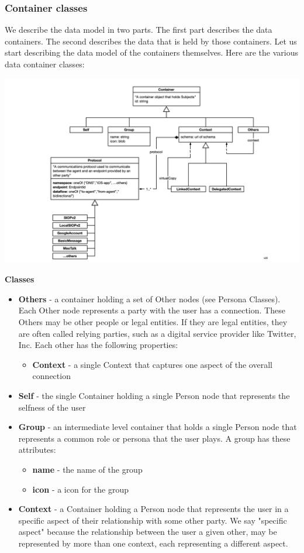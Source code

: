 \documentclass[11pt, oneside]{article}   	%
\begin{document}
\subsubsection{Container classes}

We describe the data model in two parts. The first part describes the data containers. The second describes the data that is held by those containers. Let us start describing the data model of the containers themselves. Here are the various data container classes: 

\includegraphics[width=\textwidth]{./images/container-classes.png}

\textbf{Classes}

\begin{itemize}
\item \textbf{Others} - a container holding a set of Other nodes (see Persona Classes). Each Other node represents a party with the user has a connection. These Others may be other people or legal entities. If they are legal entities, they are often called relying parties, such as a digital service provider like Twitter, Inc. Each other has the following properties:
	\begin{itemize}
	\item \textbf{Context} - a single Context that captures one aspect of the overall connection
	\end{itemize}
\item \textbf{Self} - the single Container holding a single Person node that represents the selfness of the user
\item \textbf{Group} - an intermediate level container that holds a single Person node that represents a common role or persona that the user plays. A group has these attributes:
	\begin{itemize}
	\item \textbf{name} - the name of the group 
	\item \textbf{icon} - a icon for the group
	\end{itemize}
\item \textbf{Context} - a Container holding a Person node that represents the user in a specific aspect of their relationship with some other party. We say "specific aspect" because the relationship between the user a given other, may be represented by more than one context, each representing a different aspect. 
\end{itemize}
\end{document}
